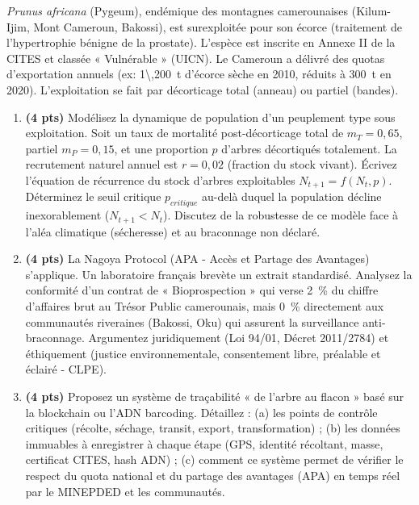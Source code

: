 \documentclass[11pt]{article}
\begin{document}
\begin{exercice}
\textit{Prunus africana} (Pygeum), endémique des montagnes camerounaises (Kilum-Ijim, Mont Cameroun, Bakossi), est surexploitée pour son écorce (traitement de l'hypertrophie bénigne de la prostate). L'espèce est inscrite en Annexe II de la CITES et classée « Vulnérable » (UICN). Le Cameroun a délivré des quotas d'exportation annuels (ex: \SI{1\,200}{t} d'écorce sèche en 2010, réduits à \SI{300}{t} en 2020). L'exploitation se fait par décorticage total (anneau) ou partiel (bandes).

\begin{enumerate}
\item \textbf{(4 pts)} Modélisez la dynamique de population d'un peuplement type sous exploitation. Soit un taux de mortalité post-décorticage total de $m_T = 0,65$, partiel $m_P = 0,15$, et une proportion $p$ d'arbres décortiqués totalement. La recrutement naturel annuel est $r = 0,02$ (fraction du stock vivant). Écrivez l'équation de récurrence du stock d'arbres exploitables $N_{t+1} = f(N_t, p)$. Déterminez le seuil critique $p_{critique}$ au-delà duquel la population décline inexorablement ($N_{t+1} < N_t$). Discutez de la robustesse de ce modèle face à l'aléa climatique (sécheresse) et au braconnage non déclaré.
\item \textbf{(4 pts)} La Nagoya Protocol (APA - Accès et Partage des Avantages) s'applique. Un laboratoire français brevète un extrait standardisé. Analysez la conformité d'un contrat de « Bioprospection » qui verse \SI{2}{\%} du chiffre d'affaires brut au Trésor Public camerounais, mais \SI{0}{\%} directement aux communautés riveraines (Bakossi, Oku) qui assurent la surveillance anti-braconnage. Argumentez juridiquement (Loi 94/01, Décret 2011/2784) et éthiquement (justice environnementale, consentement libre, préalable et éclairé - CLPE).
\item \textbf{(4 pts)} Proposez un système de traçabilité « de l'arbre au flacon » basé sur la blockchain ou l'ADN barcoding. Détaillez : (a) les points de contrôle critiques (récolte, séchage, transit, export, transformation) ; (b) les données immuables à enregistrer à chaque étape (GPS, identité récoltant, masse, certificat CITES, hash ADN) ; (c) comment ce système permet de vérifier le respect du quota national et du partage des avantages (APA) en temps réel par le MINEPDED et les communautés.
\end{enumerate}
\end{exercice}
\end{document}

